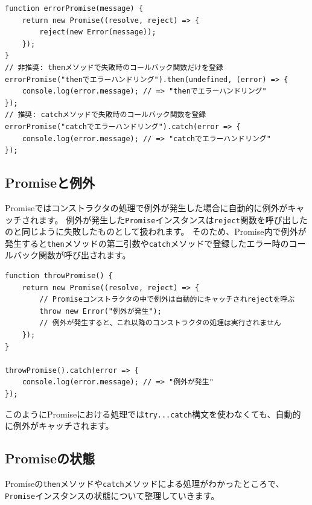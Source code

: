 \begin{lstlisting}
function errorPromise(message) {
    return new Promise((resolve, reject) => {
        reject(new Error(message));
    });
}
// 非推奨: thenメソッドで失敗時のコールバック関数だけを登録
errorPromise("thenでエラーハンドリング").then(undefined, (error) => {
    console.log(error.message); // => "thenでエラーハンドリング"
});
// 推奨: catchメソッドで失敗時のコールバック関数を登録
errorPromise("catchでエラーハンドリング").catch(error => {
    console.log(error.message); // => "catchでエラーハンドリング"
});
\end{lstlisting}

\hypertarget{promsie-exception}{%
\subsection{Promiseと例外}\label{promsie-exception}}

Promiseではコンストラクタの処理で例外が発生した場合に自動的に例外がキャッチされます。
例外が発生した\texttt{Promise}インスタンスは\texttt{reject}関数を呼び出したのと同じように失敗したものとして扱われます。
そのため、Promise内で例外が発生すると\texttt{then}メソッドの第二引数や\texttt{catch}メソッドで登録したエラー時のコールバック関数が呼び出されます。

\begin{lstlisting}
function throwPromise() {
    return new Promise((resolve, reject) => {
        // Promiseコンストラクタの中で例外は自動的にキャッチされrejectを呼ぶ
        throw new Error("例外が発生");
        // 例外が発生すると、これ以降のコンストラクタの処理は実行されません
    });
}

throwPromise().catch(error => {
    console.log(error.message); // => "例外が発生"
});
\end{lstlisting}

このようにPromiseにおける処理では\texttt{try...catch}構文を使わなくても、自動的に例外がキャッチされます。

\hypertarget{promise-status}{%
\subsection{Promiseの状態}\label{promise-status}}

Promiseの\texttt{then}メソッドや\texttt{catch}メソッドによる処理がわかったところで、\texttt{Promise}インスタンスの状態について整理していきます。

